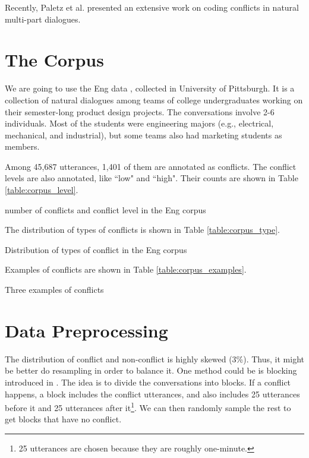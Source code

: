 \documentclass[11pt,letterpaper]{article}
\begin{document}
Recently, Paletz et al.  presented an extensive work on coding conflicts in natural multi-part dialogues.

\section{The Corpus}
We are going to use the Eng data \cite{Jang:2012,Friedberg:2012}, collected in University of Pittsburgh.
It is a collection of natural dialogues among teams of college undergraduates working on their semester-long product design projects.
The conversations involve 2-6 individuals. Most of the students were engineering majors (e.g., electrical, mechanical, and industrial), but some teams also had marketing students as members.

Among 45,687 utterances, 1,401 of them are annotated as conflicts. The conflict levels are also annotated, like ``low" and ``high". Their counts are shown in Table \ref{table:corpus_level}.
\begin{table}[!htb] 
\centering

\caption{number of conflicts and conflict level in the Eng corpus}
\label{table:corpus_level}
\end{table}

The distribution of types of conflicts is shown in Table \ref{table:corpus_type}.
\begin{table*}[!htb] 
\centering

\caption{Distribution of types of conflict in the Eng corpus}
\label{table:corpus_type}
\end{table*}

Examples of conflicts are shown in Table \ref{table:corpus_examples}.
\begin{table*}[!htb] 
\centering

\caption{Three examples of conflicts}
\label{table:corpus_examples}
\end{table*}

\section{Data Preprocessing}
The distribution of conflict and non-conflict is highly skewed (3\%). Thus, it might be better do resampling in order to balance it.
One method could  be is blocking introduced in \cite{Paletz:2011}. The idea is to divide the conversations into blocks. If a conflict happens, a block includes the conflict utterances, and also includes 25 utterances before it and 25 utterances after it\footnote{25 utterances are chosen because they are roughly one-minute.}. We can then randomly sample the rest to get blocks that have no conflict.
\end{document}
